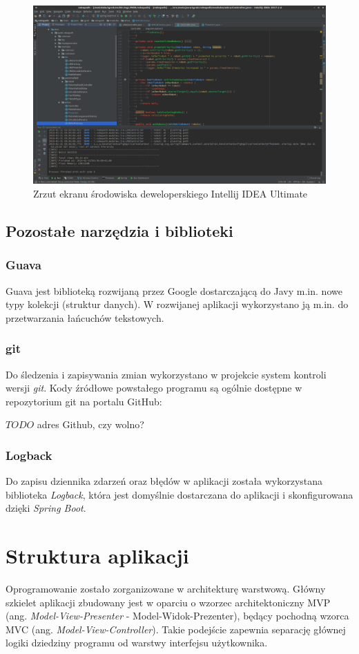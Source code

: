 \begin{figure}
	\centering
	\includegraphics[width=0.9\columnwidth]{img/robopath/intellij}
	\caption{Zrzut ekranu środowiska deweloperskiego Intellij IDEA Ultimate}
	\label{fig:app-tech-intellij}
\end{figure}

\subsection{Pozostałe narzędzia i biblioteki}
\subsubsection{Guava}
Guava jest biblioteką rozwijaną przez Google dostarczającą do Javy m.in. nowe typy kolekcji (struktur danych). W rozwijanej aplikacji wykorzystano ją m.in. do przetwarzania łańcuchów tekstowych.
\subsubsection{git}
Do śledzenia i zapisywania zmian wykorzystano w projekcie system kontroli wersji {\it git}.
Kody źródłowe powstałego programu są ogólnie dostępne w repozytorium git na portalu GitHub:

$TODO$ adres Github, czy wolno?
\subsubsection{Logback}
Do zapisu dziennika zdarzeń oraz błędów w aplikacji została wykorzystana biblioteka {\it Logback}, która jest domyślnie dostarczana do aplikacji i skonfigurowana dzięki {\it Spring Boot}.


\section{Struktura aplikacji}
Oprogramowanie zostało zorganizowane w architekturę warstwową.
Główny szkielet aplikacji zbudowany jest w oparciu o wzorzec architektoniczny MVP (ang. {\it Model-View-Presenter} - Model-Widok-Prezenter), będący pochodną wzorca MVC (ang. {\it Model-View-Controller}).
Takie podejście zapewnia separację głównej logiki dziedziny programu od warstwy interfejsu użytkownika.

